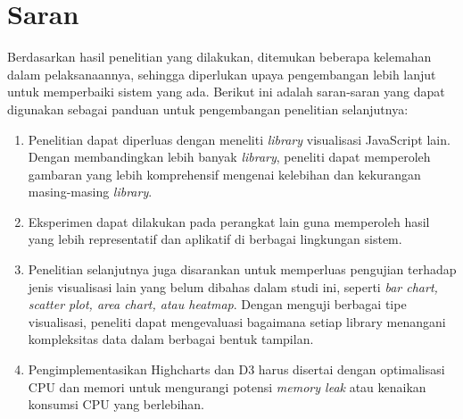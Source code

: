 \section{Saran}
Berdasarkan hasil penelitian yang dilakukan, ditemukan beberapa kelemahan dalam pelaksanaannya, sehingga diperlukan upaya pengembangan lebih lanjut untuk memperbaiki sistem yang ada. Berikut ini adalah saran-saran yang dapat digunakan sebagai panduan untuk pengembangan penelitian selanjutnya:
\begin{enumerate}
    \item Penelitian dapat diperluas dengan meneliti \textit{library} visualisasi JavaScript lain. Dengan membandingkan lebih banyak \textit{library}, peneliti dapat memperoleh gambaran yang lebih komprehensif mengenai kelebihan dan kekurangan masing-masing \textit{library}. 
    \item Eksperimen dapat dilakukan pada perangkat lain guna memperoleh hasil yang lebih representatif dan aplikatif di berbagai lingkungan sistem.
    \item Penelitian selanjutnya juga disarankan untuk memperluas pengujian terhadap jenis visualisasi lain yang belum dibahas dalam studi ini, seperti \textit{bar chart, scatter plot, area chart, atau heatmap}. Dengan menguji berbagai tipe visualisasi, peneliti dapat mengevaluasi bagaimana setiap library menangani kompleksitas data dalam berbagai bentuk tampilan.
    \item Pengimplementasikan Highcharts dan D3 harus disertai dengan optimalisasi CPU dan memori untuk mengurangi potensi \textit{memory leak} atau kenaikan konsumsi CPU yang berlebihan.
\end{enumerate}